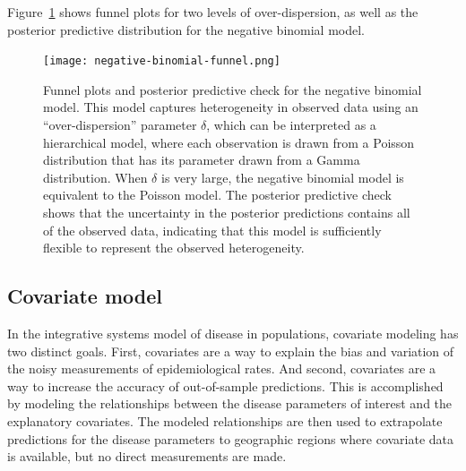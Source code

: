 \documentclass[12pt]{article}
\newcommand{\1}{\mathbf{1}}
\newcommand{\0}{\mathbf{0}}
\begin{document}
Figure~\ref{rate-model-negative-binomial-funnel} shows funnel plots
for two levels of over-dispersion, as well as the posterior predictive
distribution for the negative binomial model.

\begin{figure}[ht]
\begin{center}
\texttt{[image: negative-binomial-funnel.png]}

\end{center}
\caption{Funnel plots and posterior predictive check for the negative
  binomial model. This model captures heterogeneity in observed data
  using an ``over-dispersion'' parameter $\delta$, which can be
  interpreted as a hierarchical model, where each observation is drawn
  from a Poisson distribution that has its parameter drawn from a
  Gamma distribution.  When $\delta$ is very large, the negative
  binomial model is equivalent to the Poisson model.  The posterior
  predictive check shows that the uncertainty in the posterior
  predictions contains all of the observed data, indicating that this
  model is sufficiently flexible to represent the observed
  heterogeneity.} \label{rate-model-negative-binomial-funnel}
\end{figure}


\subsection{Covariate model}
In the integrative systems model of disease in populations, covariate
modeling has two distinct goals.  First, covariates are a way to
explain the bias and variation of the noisy measurements of
epidemiological rates.  And second, covariates are a way to increase
the accuracy of out-of-sample predictions.  This is accomplished by
modeling the relationships between the disease parameters of interest
and the explanatory covariates. The modeled relationships are then
used to extrapolate predictions for the disease parameters to
geographic regions where covariate data is available, but no direct
measurements are made.
\end{document}
